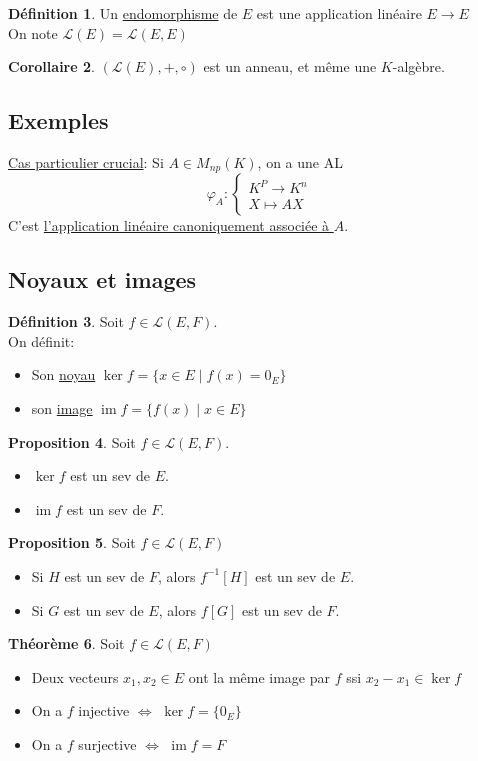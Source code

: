 \documentclass[10pt,a4paper]{article}
\theoremstyle{definition}
\newtheorem{proposition}{Proposition}[section]
\newtheorem{theorem}[proposition]{Théorème}
\newtheorem{corollaire}[proposition]{Corollaire}
\newtheorem{definition}[proposition]{Définition}
\DeclareMathOperator{\im}{im}
\begin{document}
\begin{definition}
Un \uline{endomorphisme} de $E$ est une application linéaire $E \to E$ \\
On note $\mathcal{L}(E) = \mathcal{L}(E, E)$
\end{definition}
\begin{corollaire}
$(\mathcal{L}(E), +, \circ)$ est un anneau, et même une $K$-algèbre.
\end{corollaire}

\subsection{Exemples}
\uline{Cas particulier crucial}: Si $A \in M_{np}(K)$, on a une AL
\[\varphi_A: \begin{cases}
K^P \to K^n \\
X \mapsto AX
\end{cases}\]
C'est \uline{l'application linéaire canoniquement associée à $A$}.

\subsection{Noyaux et images}
\begin{definition}
Soit $f \in \mathcal{L}(E, F)$. \\
On définit:
\begin{itemize}
\item Son \uline{noyau} $\ker f = \{ x \in E \mid f(x) = 0_E \}$
\item son \uline{image} $\im f = \{ f(x) \mid x \in E \}$
\end{itemize}
\end{definition}
\begin{proposition}
Soit $f \in \mathcal{L}(E, F)$.
\begin{itemize}
\item $\ker f$ est un sev de $E$.
\item $\im f$ est un sev de $F$.
\end{itemize}
\end{proposition}
\begin{proposition}
Soit $f \in \mathcal{L}(E, F)$
\begin{itemize}
\item Si $H$ est un sev de $F$, alors $f^{-1}[H]$ est un sev de $E$.
\item Si $G$ est un sev de $E$, alors $f[G]$ est un sev de $F$.
\end{itemize}
\end{proposition}
\begin{theorem}
Soit $f \in \mathcal{L}(E, F)$
\begin{itemize}
\item Deux vecteurs $x_1, x_2 \in E$ ont la même image par $f$ ssi $x_2 - x_1 \in \ker f$
\item On a $f$ injective $\iff$ $\ker f = \{ 0_E \}$
\item On a $f$ surjective $\iff$ $\im f = F$
\end{itemize}
\end{theorem}
\end{document}
